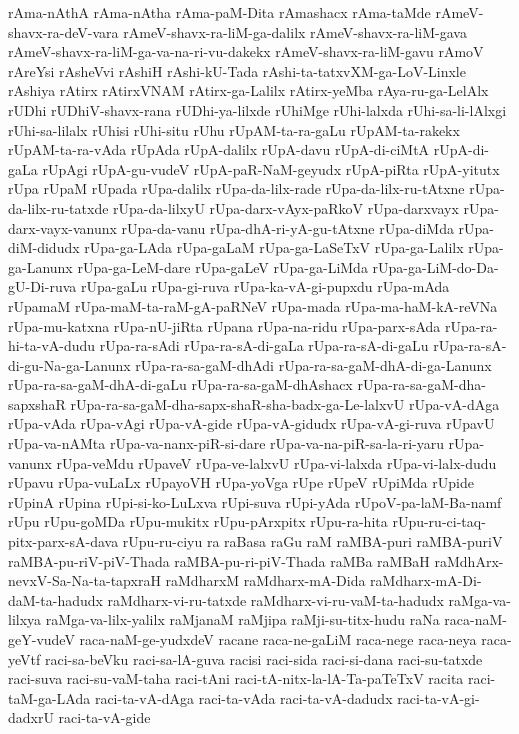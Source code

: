 {rAma-nAthA
rAma-nAtha
rAma-paM-Dita
rAmashacx
rAma-taMde
rAmeV-shavx-ra-deV-vara
rAmeV-shavx-ra-liM-ga-dalilx
rAmeV-shavx-ra-liM-gava
rAmeV-shavx-ra-liM-ga-va-na-ri-vu-dakekx
rAmeV-shavx-ra-liM-gavu
rAmoV
rAreYsi
rAsheVvi
rAshiH
rAshi-kU-Tada
rAshi-ta-tatxvXM-ga-LoV-Linxle
rAshiya
rAtirx
rAtirxVNAM
rAtirx-ga-Lalilx
rAtirx-yeMba
rAya-ru-ga-LelAlx
rUDhi
rUDhiV-shavx-rana
rUDhi-ya-lilxde
rUhiMge
rUhi-lalxda
rUhi-sa-li-lAlxgi
rUhi-sa-lilalx
rUhisi
rUhi-situ
rUhu
rUpAM-ta-ra-gaLu
rUpAM-ta-rakekx
rUpAM-ta-ra-vAda
rUpAda
rUpA-dalilx
rUpA-davu
rUpA-di-ciMtA
rUpA-di-gaLa
rUpAgi
rUpA-gu-vudeV
rUpA-paR-NaM-geyudx
rUpA-piRta
rUpA-yitutx
rUpa
rUpaM
rUpada
rUpa-dalilx
rUpa-da-lilx-rade
rUpa-da-lilx-ru-tAtxne
rUpa-da-lilx-ru-tatxde
rUpa-da-lilxyU
rUpa-darx-vAyx-paRkoV
rUpa-darxvayx
rUpa-darx-vayx-vanunx
rUpa-da-vanu
rUpa-dhA-ri-yA-gu-tAtxne
rUpa-diMda
rUpa-diM-didudx
rUpa-ga-LAda
rUpa-gaLaM
rUpa-ga-LaSeTxV
rUpa-ga-Lalilx
rUpa-ga-Lanunx
rUpa-ga-LeM-dare
rUpa-gaLeV
rUpa-ga-LiMda
rUpa-ga-LiM-do-Da-gU-Di-ruva
rUpa-gaLu
rUpa-gi-ruva
rUpa-ka-vA-gi-pupxdu
rUpa-mAda
rUpamaM
rUpa-maM-ta-raM-gA-paRNeV
rUpa-mada
rUpa-ma-haM-kA-reVNa
rUpa-mu-katxna
rUpa-nU-jiRta
rUpana
rUpa-na-ridu
rUpa-parx-sAda
rUpa-ra-hi-ta-vA-dudu
rUpa-ra-sAdi
rUpa-ra-sA-di-gaLa
rUpa-ra-sA-di-gaLu
rUpa-ra-sA-di-gu-Na-ga-Lanunx
rUpa-ra-sa-gaM-dhAdi
rUpa-ra-sa-gaM-dhA-di-ga-Lanunx
rUpa-ra-sa-gaM-dhA-di-gaLu
rUpa-ra-sa-gaM-dhAshacx
rUpa-ra-sa-gaM-dha-sapxshaR
rUpa-ra-sa-gaM-dha-sapx-shaR-sha-badx-ga-Le-lalxvU
rUpa-vA-dAga
rUpa-vAda
rUpa-vAgi
rUpa-vA-gide
rUpa-vA-gidudx
rUpa-vA-gi-ruva
rUpavU
rUpa-va-nAMta
rUpa-va-nanx-piR-si-dare
rUpa-va-na-piR-sa-la-ri-yaru
rUpa-vanunx
rUpa-veMdu
rUpaveV
rUpa-ve-lalxvU
rUpa-vi-lalxda
rUpa-vi-lalx-dudu
rUpavu
rUpa-vuLaLx
rUpayoVH
rUpa-yoVga
rUpe
rUpeV
rUpiMda
rUpide
rUpinA
rUpina
rUpi-si-ko-LuLxva
rUpi-suva
rUpi-yAda
rUpoV-pa-laM-Ba-namf
rUpu
rUpu-goMDa
rUpu-mukitx
rUpu-pArxpitx
rUpu-ra-hita
rUpu-ru-ci-taq-pitx-parx-sA-dava
rUpu-ru-ciyu
ra
raBasa
raGu
raM
raMBA-puri
raMBA-puriV
raMBA-pu-riV-piV-Thada
raMBA-pu-ri-piV-Thada
raMBa
raMBaH
raMdhArx-nevxV-Sa-Na-ta-tapxraH
raMdharxM
raMdharx-mA-Dida
raMdharx-mA-Di-daM-ta-hadudx
raMdharx-vi-ru-tatxde
raMdharx-vi-ru-vaM-ta-hadudx
raMga-va-lilxya
raMga-va-lilx-yalilx
raMjanaM
raMjipa
raMji-su-titx-hudu
raNa
raca-naM-geY-vudeV
raca-naM-ge-yudxdeV
racane
raca-ne-gaLiM
raca-nege
raca-neya
raca-yeVtf
raci-sa-beVku
raci-sa-lA-guva
racisi
raci-sida
raci-si-dana
raci-su-tatxde
raci-suva
raci-su-vaM-taha
raci-tAni
raci-tA-nitx-la-lA-Ta-paTeTxV
racita
raci-taM-ga-LAda
raci-ta-vA-dAga
raci-ta-vAda
raci-ta-vA-dadudx
raci-ta-vA-gi-dadxrU
raci-ta-vA-gide
}
